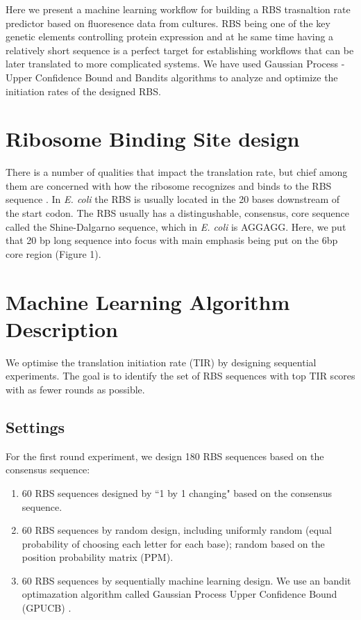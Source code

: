 \documentclass{article}
\begin{document}
Here we present a machine learning workflow for building a RBS trasnaltion rate predictor based on fluoresence data from cultures. RBS being one of the key genetic elements controlling protein expression and at he same time having a relatively short sequence is a perfect target for establishing workflows that can be later translated to more complicated systems. We have used Gaussian Process - Upper Confidence Bound and Bandits algorithms to analyze and optimize the initiation rates of the designed RBS.

\section{Ribosome Binding Site design}
There is a number of qualities that impact the translation rate, but chief among them are concerned with how the ribosome recognizes and binds to the RBS sequence \cite{Chen1994,Vellanoweth1992}. In \emph{E. coli} the RBS is usually located in the 20 bases downstream of the start codon. The RBS usually has a distingushable, consensus, core sequence called the Shine-Dalgarno sequence, which in \emph{E. coli} is AGGAGG. Here, we put that 20 bp long sequence into focus with main emphasis being put on the 6bp core region (Figure 1). \\


\section{Machine Learning Algorithm Description}

We optimise the translation initiation rate (TIR) by designing sequential experiments. The goal is to identify the set of RBS sequences with top TIR scores with as fewer rounds as possible. 

\subsection{Settings}

For the first round experiment, we design 180 RBS sequences based on the consensus sequence: 

\begin{enumerate}
    \item 60 RBS sequences designed by ``1 by 1 changing" based on the consensus sequence.
    \item 60 RBS sequences by random design, including uniformly random (equal probability of choosing each letter for each base); random based on the position probability matrix (PPM).
    \item 60 RBS sequences by sequentially machine learning design. We use an bandit optimazation algorithm called Gaussian Process Upper Confidence Bound (GPUCB) \cite{srinivas2012information}.   
\end{enumerate}{}
\end{document}
